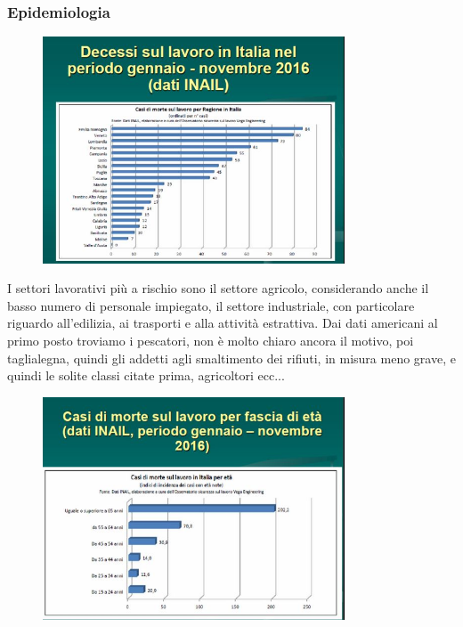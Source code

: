 \subsubsection{Epidemiologia}

\begin{figure}[!ht]
\centering
	\includegraphics[width=0.8\textwidth]{28/image8.jpg}
	\end{figure}

I settori lavorativi più a rischio sono il settore agricolo,
considerando anche il basso numero di personale impiegato, il settore
industriale, con particolare riguardo all'edilizia, ai trasporti e alla
attività estrattiva. Dai dati americani al primo posto troviamo i
pescatori, non è molto chiaro ancora il motivo, poi taglialegna, quindi
gli addetti agli smaltimento dei rifiuti, in misura meno grave, e quindi
le solite classi citate prima, agricoltori ecc...

\begin{figure}[!ht]
\centering
	\includegraphics[width=0.8\textwidth]{28/image9.jpg}
	\end{figure}

